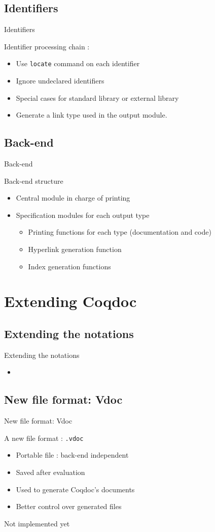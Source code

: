 \documentclass[compress]{beamer}
\newenvironment{tframe}[1]{
  \subsection{#1}
  \begin{frame}{#1}
  }{
  \end{frame}
  }
\begin{document}
  \begin{tframe}{Identifiers}
    Identifier processing chain :
    \begin{itemize}
      \item Use \texttt{locate} command on each identifier
      \item Ignore undeclared identifiers
      \item Special cases for standard library or external library
      \item Generate a link type used in the output module.
    \end{itemize}
  \end{tframe}

  \begin{tframe}{Back-end}
    Back-end structure
    \begin{itemize}
      \item Central module in charge of printing
      \item Specification modules for each output type
        \begin{itemize}
          \item Printing functions for each type (documentation and code)
          \item Hyperlink generation function
          \item Index generation functions
        \end{itemize}
    \end{itemize}
  \end{tframe}

\section{Extending Coqdoc}
\begin{tframe}{Extending the notations}
  \begin{itemize}
    \item
  \end{itemize}
\end{tframe}
\begin{tframe}{New file format: Vdoc}
  A new file format : \texttt{.vdoc}
  \begin{itemize}
    \item Portable file : back-end independent
    \item Saved after evaluation
    \item Used to generate Coqdoc's documents
    \item Better control over generated files
  \end{itemize}
  Not implemented yet
\end{tframe}
\end{document}
